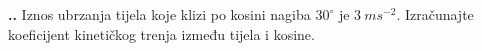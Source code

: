 

\noindent 
\textbf{
\thecjelina.\thezadatak.}
Iznos ubrzanja tijela koje klizi po kosini nagiba $30^\circ$ je $3\ ms^{-2}$. Izračunajte koeficijent kinetičkog trenja između tijela i kosine.
